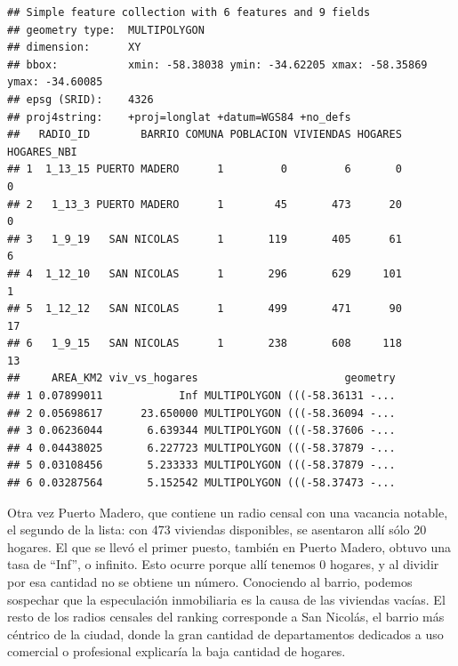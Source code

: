 \documentclass[]{book}
\newenvironment{Shaded}{\begin{snugshade}}{\end{snugshade}}
\newcommand{\KeywordTok}[1]{\textcolor[rgb]{0.13,0.29,0.53}{\textbf{#1}}}
\newcommand{\DataTypeTok}[1]{\textcolor[rgb]{0.13,0.29,0.53}{#1}}
\newcommand{\StringTok}[1]{\textcolor[rgb]{0.31,0.60,0.02}{#1}}
\newcommand{\OperatorTok}[1]{\textcolor[rgb]{0.81,0.36,0.00}{\textbf{#1}}}
\newcommand{\NormalTok}[1]{#1}
\begin{document}
\begin{Shaded}
\end{Shaded}

\begin{verbatim}
## Simple feature collection with 6 features and 9 fields
## geometry type:  MULTIPOLYGON
## dimension:      XY
## bbox:           xmin: -58.38038 ymin: -34.62205 xmax: -58.35869 ymax: -34.60085
## epsg (SRID):    4326
## proj4string:    +proj=longlat +datum=WGS84 +no_defs
##   RADIO_ID        BARRIO COMUNA POBLACION VIVIENDAS HOGARES HOGARES_NBI
## 1  1_13_15 PUERTO MADERO      1         0         6       0           0
## 2   1_13_3 PUERTO MADERO      1        45       473      20           0
## 3   1_9_19   SAN NICOLAS      1       119       405      61           6
## 4  1_12_10   SAN NICOLAS      1       296       629     101           1
## 5  1_12_12   SAN NICOLAS      1       499       471      90          17
## 6   1_9_15   SAN NICOLAS      1       238       608     118          13
##     AREA_KM2 viv_vs_hogares                       geometry
## 1 0.07899011            Inf MULTIPOLYGON (((-58.36131 -...
## 2 0.05698617      23.650000 MULTIPOLYGON (((-58.36094 -...
## 3 0.06236044       6.639344 MULTIPOLYGON (((-58.37606 -...
## 4 0.04438025       6.227723 MULTIPOLYGON (((-58.37879 -...
## 5 0.03108456       5.233333 MULTIPOLYGON (((-58.37879 -...
## 6 0.03287564       5.152542 MULTIPOLYGON (((-58.37473 -...
\end{verbatim}

Otra vez Puerto Madero, que contiene un radio censal con una vacancia
notable, el segundo de la lista: con 473 viviendas disponibles, se
asentaron allí sólo 20 hogares. El que se llevó el primer puesto,
también en Puerto Madero, obtuvo una tasa de ``Inf'', o infinito. Esto
ocurre porque allí tenemos 0 hogares, y al dividir por esa cantidad no
se obtiene un número. Conociendo al barrio, podemos sospechar que la
especulación inmobiliaria es la causa de las viviendas vacías. El resto
de los radios censales del ranking corresponde a San Nicolás, el barrio
más céntrico de la ciudad, donde la gran cantidad de departamentos
dedicados a uso comercial o profesional explicaría la baja cantidad de
hogares.
\end{document}
